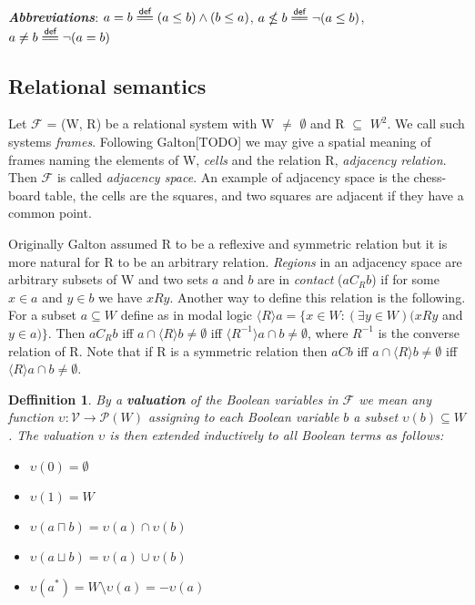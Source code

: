 \documentclass{article}
\newcommand\eqdef{\mathrel{\overset{\makebox[0pt]{\mbox{\normalfont\scriptsize\sffamily def}}}{=\joinrel=}}}
\newcommand\F{\mathcal{F}}
\newcommand\p{\mathcal{P}}
\newcommand\V{\mathcal{V}}
\newtheorem{defn}[theorem]{Deffinition}
\begin{document}
	\noindent\textbf{\textit{Abbreviations}}:
		$a = b \eqdef (a \leq b) \land (b \leq a)$,
		$a \nleq b \eqdef \neg(a \leq b)$,
		$a \neq b \eqdef \neg(a = b)$

	\subsection{Relational semantics}
	\label{relational-system}

	\par
	Let $\F$ = (W, R) be a relational system with W $\neq$ $\emptyset$ and R $\subseteq$ $W^2$. We call such systems \textit{frames}. Following Galton[TODO] we may give a spatial meaning of frames naming the elements of W, \textit{cells} and the relation R, \textit{adjacency relation}. Then $\F$ is called \textit{adjacency space}. An example of adjacency space is the chess-board table, the cells are the squares, and two squares are adjacent if they have a common point.

	\par
	Originally Galton assumed R to be a reflexive and symmetric relation but it is more natural for R to be an arbitrary relation. \textit{Regions} in an adjacency space are arbitrary subsets of W and two sets $a$ and $b$ are in \textit{contact} ($aC_Rb$) if for some $x \in a$ and $y \in b$ we have $xRy$. Another way to define this relation is the following. For a subset $a \subseteq W$ define as in modal logic $\langle R \rangle a = \{ x \in W : (\exists y \in W)(xRy$ and $y \in a)\}$. Then $aC_Rb$ iff $a \cap \langle R \rangle b \neq \emptyset$ iff $\langle R^{-1} \rangle a \cap b \neq \emptyset$, where $R^{-1}$ is the converse relation of R. Note that if R is a symmetric relation then $aCb$ iff $a \cap \langle R \rangle b \neq \emptyset$ iff $\langle R \rangle a \cap b \neq \emptyset$.

	\begin{defn}
		\label{valuation}
		By a \textbf{\textit{valuation}} of the Boolean variables in $\F$ we mean any function $\upsilon : \V \rightarrow \p(W)$ assigning to each Boolean variable $b$ a subset $\upsilon(b) \subseteq W$. The valuation $\upsilon$ is then extended inductively to all Boolean terms as follows:

		\begin{itemize}
			\item $\upsilon(0) = \emptyset$
			\item $\upsilon(1) = W$
			\item $\upsilon(a \sqcap b) = \upsilon(a) \cap \upsilon(b)$
			\item $\upsilon(a \sqcup b) = \upsilon(a) \cup \upsilon(b)$
			\item $\upsilon(a^*) = W \setminus \upsilon(a) = -\upsilon(a)$
		\end{itemize}
	\end{defn}
\end{document}
